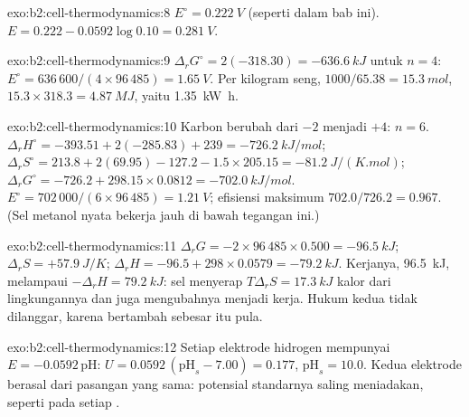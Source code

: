 \begin{solution}{exo:b2:cell-thermodynamics:8}
$E^\circ = \qty{0.222}{V}$ (seperti dalam bab ini).
$E = 0.222 - 0.0592\log 0.10 =
\qty{0.281}{V}$.
\end{solution}

\begin{solution}{exo:b2:cell-thermodynamics:9}
$\Delta_r G^\circ = 2(-318.30) = \qty{-636.6}{kJ}$ untuk $n = 4$: $E^\circ =
636\,600/(4 \times 96\,485) = \qty{1.65}{V}$. Per kilogram seng,
$1000/65.38 =
\qty{15.3}{mol}$, $15.3 \times 318.3 = \qty{4.87}{MJ}$, yaitu
\qty{1.35}{kW.h}.
\end{solution}

\begin{solution}{exo:b2:cell-thermodynamics:10}
Karbon berubah dari $-2$ menjadi $+4$: $n = 6$. $\Delta_r H^\circ = -393.51 + 2(-285.83) +
239 = \qty{-726.2}{kJ/mol}$; $\Delta_r S^\circ = 213.8 + 2(69.95) - 127.2 - 1.5
\times 205.15 = \qty{-81.2}{J/(K.mol)}$; $\Delta_r G^\circ = -726.2 + 298.15 \times
0.0812 = \qty{-702.0}{kJ/mol}$. $E^\circ = 702\,000/(6 \times 96\,485) =
\qty{1.21}{V}$; efisiensi maksimum $702.0/726.2 = 0.967$. (Sel metanol
nyata bekerja jauh di bawah tegangan ini.)
\end{solution}

\begin{solution}{exo:b2:cell-thermodynamics:11}
$\Delta_r G = -2 \times 96\,485 \times 0.500 = \qty{-96.5}{kJ}$;
$\Delta_r S = +\qty{57.9}{J/K}$;
$\Delta_r H = -96.5 + 298 \times 0.0579 = \qty{-79.2}{kJ}$. Kerjanya,
\qty{96.5}{kJ}, melampaui $-\Delta_r H = \qty{79.2}{kJ}$: sel menyerap
$T\Delta_r S = \qty{17.3}{kJ}$ kalor dari lingkungannya dan juga
mengubahnya menjadi kerja. Hukum kedua tidak dilanggar, karena  bertambah sebesar itu pula.
\end{solution}

\begin{solution}{exo:b2:cell-thermodynamics:12}
Setiap elektrode hidrogen mempunyai $E = -0.0592\,\mathrm{pH}$:
$U = 0.0592\,(\mathrm{pH}_s -
7.00) = 0.177$, $\mathrm{pH}_s = 10.0$. Kedua
elektrode berasal dari pasangan yang sama: potensial standarnya saling
meniadakan, seperti pada setiap .
\end{solution}

